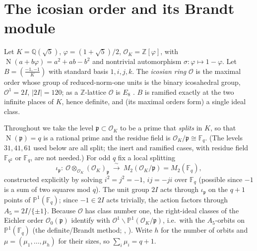 \documentclass[11pt,a4paper]{article}
\newcommand{\Q}{\mathbb{Q}}
\newcommand{\Z}{\mathbb{Z}}
\newcommand{\F}{\mathbb{F}}
\newcommand{\PP}{\mathbb{P}}
\newcommand{\Ord}{\mathcal{O}}
\newcommand{\fp}{\mathfrak{p}}
\newcommand{\OK}{\Ord_K}
\DeclareMathOperator{\Nm}{N}
\begin{document}
\section{The icosian order and its Brandt module}\label{sec:setup}

Let $K=\Q(\sqrt5)$, $\varphi=(1+\sqrt5)/2$, $\OK=\Z[\varphi]$, with
$\Nm(a+b\varphi)=a^2+ab-b^2$ and nontrivial automorphism
$\sigma:\varphi\mapsto1-\varphi$. Let $B=\left(\tfrac{-1,-1}{K}\right)$
with standard basis $1,i,j,k$. The \emph{icosian ring} $\Ord$ is the
maximal order whose group of reduced-norm-one units is the binary
icosahedral group, $\Ord^1=2I$, $|2I|=120$; as a $\Z$-lattice $\Ord$ is
$E_8$ \cite{ConwaySloane1999,Voight2021}. $B$ is ramified exactly at the
two infinite places of $K$, hence definite, and (its maximal orders
form) a single ideal class.

Throughout we take the level $\fp\subset\OK$ to be a prime that
\emph{splits} in $K$, so that $\Nm(\fp)=q$ is a rational prime and the
residue field is $\OK/\fp\cong\F_q$. (The levels $31,41,61$ used below
are all split; the inert and ramified cases, with residue field
$\F_{q^2}$ or $\F_q$, are not needed.) For odd $q$ fix a local splitting
\[
  \iota_\fp:\ \Ord\otimes_{\OK}(\OK)_\fp\ \xrightarrow{\ \sim\ }\
  M_2(\OK/\fp)=M_2(\F_q),
\]
constructed explicitly by solving $i^2=j^2=-1$, $ij=-ji$ over $\F_q$
(possible since $-1$ is a sum of two squares mod $q$). The unit group
$2I$ acts through $\iota_\fp$ on the $q+1$ points of $\PP^1(\F_q)$;
since $-1\in2I$ acts trivially, the action factors through
$A_5=2I/\{\pm1\}$. Because $\Ord$ has class number one, the right-ideal
classes of the Eichler order $\Ord_0(\fp)$ identify with
$\Ord^1\backslash\PP^1(\OK/\fp)$, i.e.\ with the $A_5$-orbits on
$\PP^1(\F_q)$ (the definite/Brandt method;
\cite[Ch.~41]{Voight2021}, \cite{Vigneras1980}). Write $h$ for the
number of orbits and $\mu=(\mu_1,\dots,\mu_h)$ for their sizes, so
$\sum_i\mu_i=q+1$.
\end{document}
